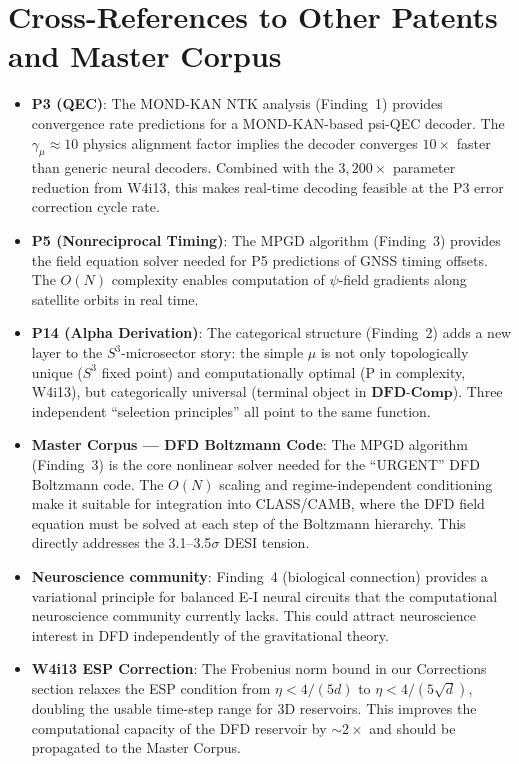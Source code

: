 \documentclass[11pt]{article}
\theoremstyle{definition}
\theoremstyle{remark}
\begin{document}
\section{Cross-References to Other Patents and Master Corpus}
\label{sec:cross-references}

\begin{itemize}
\item \textbf{P3 (QEC)}: The MOND-KAN NTK analysis (Finding~1) provides
  convergence rate predictions for a MOND-KAN-based psi-QEC decoder.
  The $\gamma_\mu \approx 10$ physics alignment factor implies the decoder
  converges $10\times$ faster than generic neural decoders. Combined with
  the $3{,}200\times$ parameter reduction from W4i13, this makes real-time
  decoding feasible at the P3 error correction cycle rate.

\item \textbf{P5 (Nonreciprocal Timing)}: The MPGD algorithm (Finding~3)
  provides the field equation solver needed for P5 predictions of GNSS
  timing offsets. The $O(N)$ complexity enables computation of $\psi$-field
  gradients along satellite orbits in real time.

\item \textbf{P14 (Alpha Derivation)}: The categorical structure (Finding~2)
  adds a new layer to the $S^3$-microsector story: the simple $\mu$ is not
  only topologically unique ($S^3$ fixed point) and computationally optimal
  (P in complexity, W4i13), but categorically universal (terminal object
  in $\mathbf{DFD\text{-}Comp}$). Three independent ``selection principles''
  all point to the same function.

\item \textbf{Master Corpus --- DFD Boltzmann Code}: The MPGD algorithm
  (Finding~3) is the core nonlinear solver needed for the ``URGENT'' DFD
  Boltzmann code. The $O(N)$ scaling and regime-independent conditioning
  make it suitable for integration into CLASS/CAMB, where the DFD field
  equation must be solved at each step of the Boltzmann hierarchy. This
  directly addresses the 3.1--3.5$\sigma$ DESI tension.

\item \textbf{Neuroscience community}: Finding~4 (biological connection)
  provides a variational principle for balanced E-I neural circuits that
  the computational neuroscience community currently lacks. This could
  attract neuroscience interest in DFD independently of the gravitational
  theory.

\item \textbf{W4i13 ESP Correction}: The Frobenius norm bound in our
  Corrections section relaxes the ESP condition from $\eta < 4/(5d)$ to
  $\eta < 4/(5\sqrt{d})$, doubling the usable time-step range for
  3D reservoirs. This improves the computational capacity of the DFD
  reservoir by $\sim 2\times$ and should be propagated to the Master Corpus.
\end{itemize}
\end{document}
